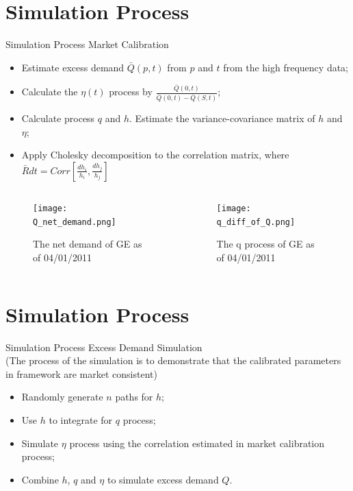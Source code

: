 \documentclass{beamer}
\begin{document}
\section{Simulation Process}
\begin{frame}[shrink=30]{{\color{cyan}Simulation Process}}
\bigskip
Market Calibration
\begin{itemize}
\item Estimate excess demand $\bar{Q}(p,t)$ from $p$ and $t$ from the high frequency data;
\item Calculate the $\eta(t)$ process by $\frac{\bar{Q}(0,t)}{\bar{Q}(0,t)-\bar{Q}(S,t)}$;
\item Calculate process $q$ and $h$. Estimate the variance-covariance matrix of $h$ and $\eta$;
\item Apply Cholesky decomposition to the correlation matrix, where $\bar{R}dt=Corr[\frac{dh_i}{h_i},\frac{dh_j}{h_j}]$
\end{itemize}

\begin{columns}

\begin{column}{0.48\textwidth}
\begin{figure}[htbp]
                \centering
                \texttt{[image: Q\_net\_demand.png]}
                \caption{The net demand of GE as of 04/01/2011}
                \label{fig:Sim_Q}
\end{figure}
\end{column}

\begin{column}{0.48\textwidth}
\begin{figure}[htbp]
                \centering
                \texttt{[image: q\_diff\_of\_Q.png]}
                \caption{The q process of GE as of 04/01/2011}
                \label{fig:Sim_q}
\end{figure}
\end{column}

\end{columns}

\end{frame}

\section{Simulation Process}
\begin{frame}[shrink=30]{{\color{cyan}Simulation Process}}
\bigskip
Excess Demand Simulation \\
(The process of the simulation is to demonstrate that the 	calibrated 	parameters in framework are market consistent)
\begin{itemize}
\item Randomly generate $n$ paths for $h$;
\item Use $h$ to integrate for $q$ process;
\item Simulate $\eta$ process using the correlation estimated in market calibration process;
\item Combine $h$, $q$ and $\eta$ to simulate excess demand $Q$.
\end{itemize}

\end{frame}
\end{document}
